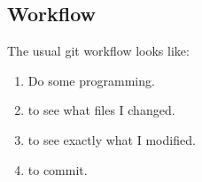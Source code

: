 
\subsection{Workflow}
The usual git workflow looks like:
\begin{enumerate}
  \item{Do some programming.}
  \item{ to see what files I changed.}
  \item{ to see exactly what I modified.}
  \item{ to commit.}
\end{enumerate}
